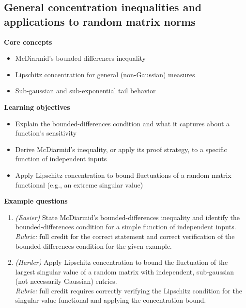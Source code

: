\documentclass[11pt]{article}
\begin{document}
\subsection{General concentration inequalities and applications to random matrix norms}
\textbf{Core concepts}
\begin{itemize}[nosep]
\item McDiarmid's bounded-differences inequality
\item Lipschitz concentration for general (non-Gaussian) measures
\item Sub-gaussian and sub-exponential tail behavior
\end{itemize}
\textbf{Learning objectives}
\begin{itemize}[nosep]
\item Explain the bounded-differences condition and what it captures about a function's sensitivity
\item Derive McDiarmid's inequality, or apply its proof strategy, to a specific function of independent inputs
\item Apply Lipschitz concentration to bound fluctuations of a random matrix functional (e.g., an extreme singular value)
\end{itemize}
\textbf{Example questions}
\begin{enumerate}[nosep]
\item \emph{(Easier)} State McDiarmid's bounded-differences inequality and identify the bounded-differences condition for a simple function of independent inputs. \\
\emph{Rubric:} full credit for the correct statement and correct verification of the bounded-differences condition for the given example.
\item \emph{(Harder)} Apply Lipschitz concentration to bound the fluctuation of the largest singular value of a random matrix with independent, sub-gaussian (not necessarily Gaussian) entries. \\
\emph{Rubric:} full credit requires correctly verifying the Lipschitz condition for the singular-value functional and applying the concentration bound.
\end{enumerate}
\end{document}
